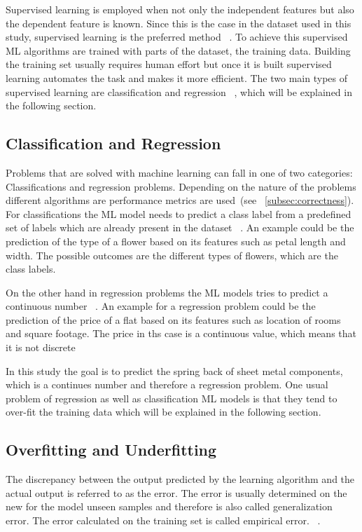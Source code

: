 Supervised learning is employed when not only the independent features but also the dependent feature is known.
Since this is the case in the dataset used in this study, supervised learning is the preferred
method
~\cite[p. 2]{muller2016introduction}.
To achieve this supervised \ac{ML} algorithms are trained with parts of the dataset, the training data.
Building the training set usually requires human effort but once it is built supervised learning automates the task
and makes it more efficient.
The two main types of supervised learning are classification and regression
~\cite[p. 25]{muller2016introduction}, which will be explained in the following section.

\subsection{Classification and Regression}\label{subsec:regression}
Problems that are solved with machine learning can fall in one of two categories: Classifications and regression
problems.
Depending on the nature of the problems different algorithms are performance metrics are used~(see
~\cref{subsec:correctness}).
For classifications the ML model needs to predict a class label from a predefined set of labels which are already
present in the dataset
~\cite[pp. 25--26]{muller2016introduction}.
An example could be the prediction of the type of a flower based on its features such as
petal length and width.
The possible outcomes are the different types of flowers, which are the class labels.

On the other hand in regression problems the ML models tries to predict a continuous number
~\cite[pp. 25--26]{muller2016introduction}.
An example for a regression problem could be the prediction of the price of a flat based on its features such as
location of rooms and square footage.
The price in ths case is a continuous value, which means that it is not discrete

In this study the goal is to predict the spring back of sheet metal components, which is a continues number and
therefore a regression problem.
One usual problem of regression as well as classification ML models is that they tend to over-fit the training data
which will be explained in the following section.

\subsection{Overfitting and Underfitting}\label{subsec:overfitting-and-underfitting}
The discrepancy between the output predicted by the learning algorithm and the actual output is referred to as the
error.
The error is usually determined on the new for the model unseen samples and therefore is also
called generalization error.
The error calculated on the training set is called empirical error.
~\cite[p. 26]{zhou2021machine}.

